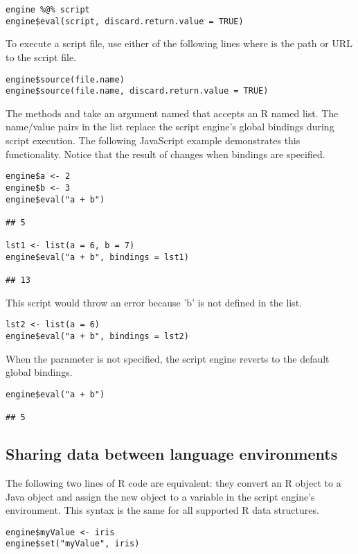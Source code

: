 \begin{verbatim}
engine %@% script
engine$eval(script, discard.return.value = TRUE)
\end{verbatim}
To execute a script file, use either of the following lines where  is the path or URL to the script file.

\begin{verbatim}
engine$source(file.name)
engine$source(file.name, discard.return.value = TRUE)
\end{verbatim}

The methods  and  take an argument named  that accepts an R named list. The name/value pairs in the list replace the script engine's global bindings during script execution. The following JavaScript example demonstrates this functionality. Notice that the result of  changes when bindings are specified.

\begin{verbatim}
engine$a <- 2
engine$b <- 3
engine$eval("a + b")

## 5

lst1 <- list(a = 6, b = 7)
engine$eval("a + b", bindings = lst1)

## 13
\end{verbatim}
This script would throw an error because 'b' is not defined in the list.
\begin{verbatim}
lst2 <- list(a = 6)
engine$eval("a + b", bindings = lst2)
\end{verbatim}
When the  parameter is not specified, the script engine reverts to the default global bindings.
\begin{verbatim}
engine$eval("a + b")

## 5
\end{verbatim}

\subsection{Sharing data between language environments}

The following two lines of R code are equivalent: they convert an R object to a Java object and assign the new object to a variable  in the script engine's environment. This syntax is the same for all supported R data structures.

\begin{verbatim}
engine$myValue <- iris
engine$set("myValue", iris)
\end{verbatim}


